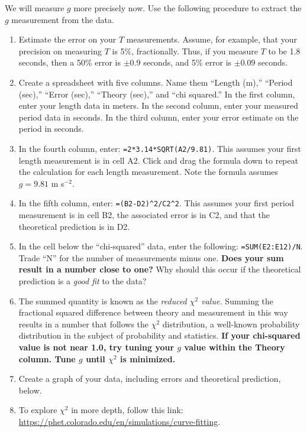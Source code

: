 \documentclass{article}
\begin{document}
We will measure $g$ more precisely now.  Use the following procedure to extract the $g$ measurement from the data.
\begin{enumerate}
\item Estimate the error on your $T$ measurements.  Assume, for example, that your precision on measuring $T$ is 5\%, fractionally.  Thus, if you measure $T$ to be 1.8 seconds, then a 50\% error is $\pm 0.9$ seconds, and 5\% error is $\pm 0.09$ seconds.
\item Create a spreadsheet with five columns.  Name them ``Length (m),'' ``Period (sec),'' ``Error (sec),'' ``Theory (sec),'' and ``chi squared.''  In the first column, enter your length data in meters.  In the second column, enter your measured period data in seconds.  In the third column, enter your error estimate on the period in seconds.
\item In the fourth column, enter: \verb+=2*3.14*SQRT(A2/9.81)+.  This assumes your first length measurement is in cell A2.  Click and drag the formula down to repeat the calculation for each length measurement.  Note the formula assumes $g = 9.81$ m s$^{-2}$.
\item In the fifth column, enter: \verb+=(B2-D2)^2/C2^2+.  This assumes your first period measurement is in cell B2, the associated error is in C2, and that the theoretical prediction is in D2.
\item In the cell below the ``chi-squared'' data, enter the following: \verb+=SUM(E2:E12)/N+.  Trade ``N'' for the number of measurements minus one.  \textbf{Does your sum result in a number close to one?}  Why should this occur if the theoretical prediction is a \textit{good fit} to the data?
\item The summed quantity is known as the \textit{reduced $\chi^2$ value.}  Summing the fractional squared difference between theory and measurement in this way results in a number that follows the $\chi^2$ distribution, a well-known probability distribution in the subject of probability and statistics.  \textbf{If your chi-squared value is not near 1.0, try tuning your $g$ value within the Theory column.  Tune $g$ until $\chi^2$ is minimized.}
\item Create a graph of your data, including errors and theoretical prediction, below.
\item To explore $\chi^2$ in more depth, follow this link: \url{https://phet.colorado.edu/en/simulations/curve-fitting}.
\end{enumerate}
\end{document}
